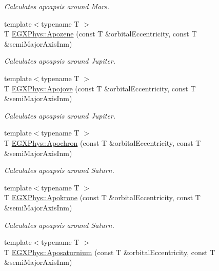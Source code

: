 \begin{DoxyCompactItemize}
\begin{DoxyCompactList}\small\item\em Calculates apoapsis around Mars. \end{DoxyCompactList}\item 
{\footnotesize template$<$typename T $>$ }\\T \mbox{\hyperlink{group___e_g_x_phys-_apoapsis_ga2de1f63be8e4e22f219c4e947588a207}{E\+G\+X\+Phys\+::\+Apozene}} (const T \&orbital\+Eccentricity, const T \&semi\+Major\+Axis\+Inm)
\begin{DoxyCompactList}\small\item\em Calculates apoapsis around Jupiter. \end{DoxyCompactList}\item 
{\footnotesize template$<$typename T $>$ }\\T \mbox{\hyperlink{group___e_g_x_phys-_apoapsis_gad2a2021d43526fc752fe87beff789b28}{E\+G\+X\+Phys\+::\+Apojove}} (const T \&orbital\+Eccentricity, const T \&semi\+Major\+Axis\+Inm)
\begin{DoxyCompactList}\small\item\em Calculates apoapsis around Jupiter. \end{DoxyCompactList}\item 
{\footnotesize template$<$typename T $>$ }\\T \mbox{\hyperlink{group___e_g_x_phys-_apoapsis_gac978de20a08121198f73637018c80eee}{E\+G\+X\+Phys\+::\+Apochron}} (const T \&orbital\+Eccentricity, const T \&semi\+Major\+Axis\+Inm)
\begin{DoxyCompactList}\small\item\em Calculates apoapsis around Saturn. \end{DoxyCompactList}\item 
{\footnotesize template$<$typename T $>$ }\\T \mbox{\hyperlink{group___e_g_x_phys-_apoapsis_ga572bf783c39ce472a06e89063f1fd1a7}{E\+G\+X\+Phys\+::\+Apokrone}} (const T \&orbital\+Eccentricity, const T \&semi\+Major\+Axis\+Inm)
\begin{DoxyCompactList}\small\item\em Calculates apoapsis around Saturn. \end{DoxyCompactList}\item 
{\footnotesize template$<$typename T $>$ }\\T \mbox{\hyperlink{group___e_g_x_phys-_apoapsis_gabb69067baa611c8bda701d7040cc47b6}{E\+G\+X\+Phys\+::\+Aposaturnium}} (const T \&orbital\+Eccentricity, const T \&semi\+Major\+Axis\+Inm)

\end{DoxyCompactItemize}
